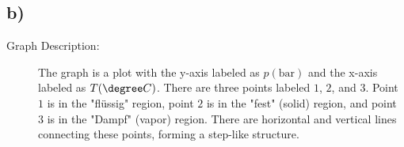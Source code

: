 

\subsection*{b)}

\begin{description}
    \item[Graph Description:] The graph is a plot with the y-axis labeled as \( p(\text{bar}) \) and the x-axis labeled as \( T(\degree C) \). There are three points labeled \( 1 \), \( 2 \), and \( 3 \). Point \( 1 \) is in the "flüssig" region, point \( 2 \) is in the "fest" (solid) region, and point \( 3 \) is in the "Dampf" (vapor) region. There are horizontal and vertical lines connecting these points, forming a step-like structure.
\end{description}